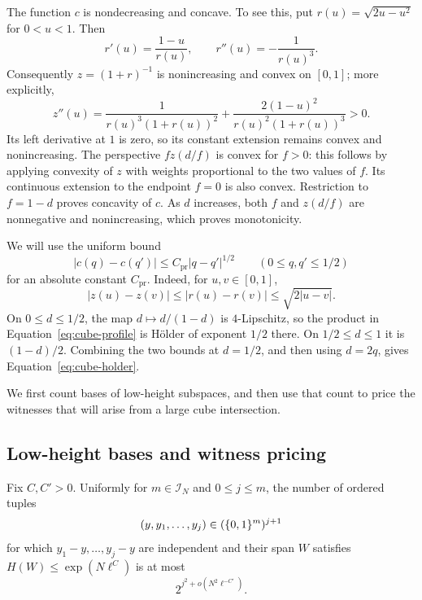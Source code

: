 The function \(c\) is nondecreasing and concave. To see this, put
\(r(u)=\sqrt{2u-u^2}\) for \(0<u<1\). Then
\[
 r'(u)=\frac{1-u}{r(u)},\qquad r''(u)=-\frac1{r(u)^3}.
\]
Consequently \(z=(1+r)^{-1}\) is nonincreasing and convex on \([0,1]\);
more explicitly,
\[
 z''(u)=\frac{1}{r(u)^3(1+r(u))^2}
       +\frac{2(1-u)^2}{r(u)^2(1+r(u))^3}>0.
\]
Its left derivative at \(1\) is zero, so its constant extension remains
convex and nonincreasing. The perspective \(fz(d/f)\) is convex for
\(f>0\): this follows by applying convexity of \(z\) with weights
proportional to the two values of \(f\). Its continuous extension to
the endpoint \(f=0\) is also convex. Restriction to \(f=1-d\) proves
concavity of \(c\). As \(d\) increases, both \(f\) and \(z(d/f)\) are
nonnegative and nonincreasing, which proves monotonicity.

We will use the uniform bound
\begin{equation}\label{eq:cube-holder}
 |c(q)-c(q')|\le C_{\mathrm{pr}}|q-q'|^{1/2}
 \qquad(0\le q,q'\le1/2)
\end{equation}
for an absolute constant \(C_{\mathrm{pr}}\). Indeed, for \(u,v\in[0,1]\),
\[
 |z(u)-z(v)|\le |r(u)-r(v)|
 \le \sqrt{2|u-v|}.
\]
On \(0\le d\le1/2\), the map \(d\mapsto d/(1-d)\) is \(4\)-Lipschitz,
so the product in Equation~\eqref{eq:cube-profile} is
Hölder of exponent \(1/2\) there. On \(1/2\le d\le1\) it is
\((1-d)/2\). Combining the two bounds at \(d=1/2\), and then using
\(d=2q\), gives Equation~\eqref{eq:cube-holder}.

We first count bases of low-height subspaces, and then use that count
to price the witnesses that will arise from a large cube intersection.

\subsection{Low-height bases and witness pricing}

\begin{lemma}\label{lem:exact-basis-count}
Fix \(C,C'>0\). Uniformly for \(m\in\mathcal I_N\) and \(0\le j\le m\),
the number of ordered tuples
\[
 (y,y_1,\ldots,y_j)\in(\{0,1\}^m)^{j+1}
\]
for which \(y_1-y,\ldots,y_j-y\) are independent and their span \(W\)
satisfies \(H(W)\le\exp(N\ell^C)\) is at most
\[
 2^{j^2+o(N^2\ell^{-C'})}.
\]
\end{lemma}

